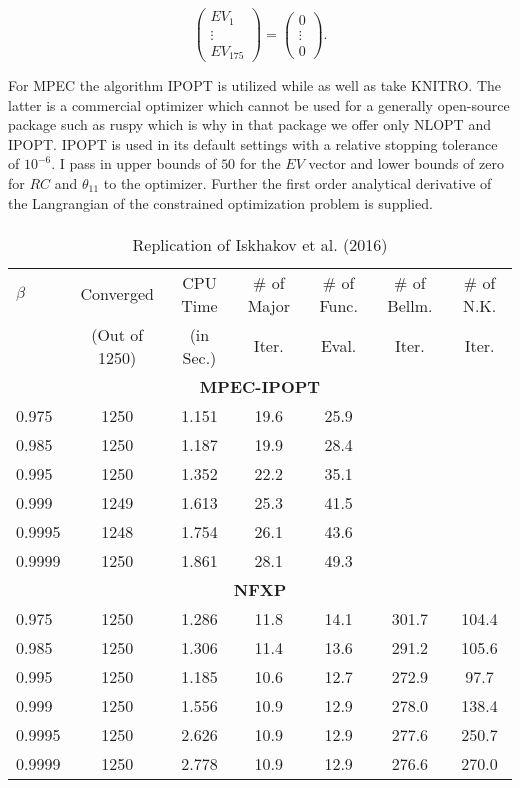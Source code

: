 \begin{equation*}
	\begin{pmatrix} EV_1 \\ \vdots \\ EV_{175} \end{pmatrix} = \begin{pmatrix} 0 \\ \vdots \\ 0 \end{pmatrix}.
\end{equation*}

For MPEC the algorithm IPOPT is utilized while \citeauthor{Iskhakov.2016} as well as \citeauthor{Su.Judd.2012} take KNITRO. The latter is a commercial optimizer which cannot be used for a generally open-source package such as ruspy which is why in that package we offer only NLOPT and IPOPT. IPOPT is used in its default settings with a relative stopping tolerance of $10^{-6}$. I pass in upper bounds of $50$ for the $EV$ vector and lower bounds of zero for $RC$ and $\theta_{11}$ to the optimizer. Further the first order analytical derivative of the Langrangian of the constrained optimization problem is supplied.\paragraph{}

\begin{table}[H]
	\centering
	\caption{Replication of Iskhakov et al. (2016)}
	\label{table1}
	\begin{tabular}{l c c c c c c}
		\toprule\midrule
		$\beta$ & Converged  & CPU Time & \# of Major & \# of Func. & \# of Bellm. & \# of N.K.   \\
		& (Out of 1250) & (in Sec.) & Iter. & Eval. & Iter. & Iter. \\
		\midrule
		\multicolumn{7}{c}{\textbf{MPEC-IPOPT}} \\
		0.975 & 1250 & 1.151 & 19.6 & 25.9 \\
		0.985 & 1250 & 1.187 & 19.9 & 28.4 \\
		0.995 & 1250 & 1.352 & 22.2 & 35.1 \\
		0.999 & 1249 & 1.613 & 25.3 & 41.5 \\
		0.9995 & 1248 & 1.754 & 26.1 & 43.6 \\
		0.9999 & 1250 & 1.861 & 28.1 & 49.3 \\
		\multicolumn{7}{c}{\textbf{NFXP}} \\
		0.975 & 1250 & 1.286 & 11.8 & 14.1 & 301.7 & 104.4 \\
		0.985 & 1250 & 1.306 & 11.4 & 13.6 & 291.2 & 105.6 \\
		0.995 & 1250 & 1.185 & 10.6 & 12.7 & 272.9 & 97.7 \\
		0.999 & 1250  & 1.556 & 10.9 & 12.9 & 278.0 & 138.4 \\
		0.9995 & 1250 & 2.626 & 10.9 & 12.9 & 277.6 & 250.7 \\
		0.9999 & 1250 & 2.778 & 10.9 & 12.9 & 276.6 & 270.0 \\
		\bottomrule
	\end{tabular}
\end{table}

